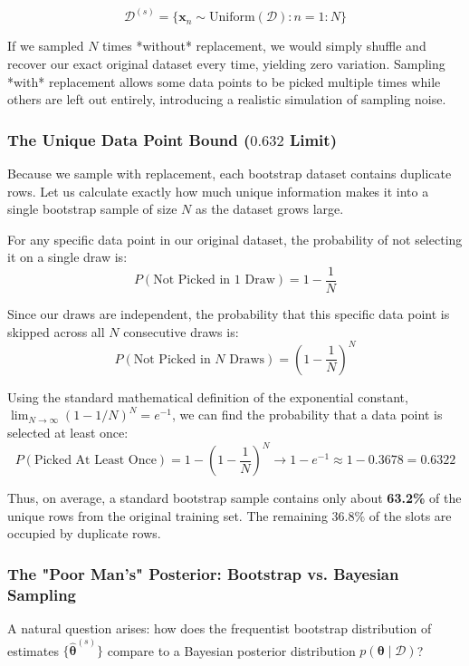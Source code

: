 \documentclass{article}
\begin{document}
\begin{equation}
\mathcal{D}^{(s)} = \{\mathbf{x}_n \sim \text{Uniform}(\mathcal{D}) : n = 1 : N\}
\end{equation}

If we sampled $N$ times *without* replacement, we would simply shuffle and recover our exact original dataset every time, yielding zero variation. Sampling *with* replacement allows some data points to be picked multiple times while others are left out entirely, introducing a realistic simulation of sampling noise.



\subsubsection{The Unique Data Point Bound ($0.632$ Limit)}
Because we sample with replacement, each bootstrap dataset contains duplicate rows. Let us calculate exactly how much unique information makes it into a single bootstrap sample of size $N$ as the dataset grows large.

For any specific data point in our original dataset, the probability of not selecting it on a single draw is:
\begin{equation}
P(\text{Not Picked in 1 Draw}) = 1 - \frac{1}{N}
\end{equation}

Since our draws are independent, the probability that this specific data point is skipped across all $N$ consecutive draws is:
\begin{equation}
P(\text{Not Picked in } N \text{ Draws}) = \left(1 - \frac{1}{N}\right)^N
\end{equation}

Using the standard mathematical definition of the exponential constant, $\lim_{N \to \infty} (1 - 1/N)^N = e^{-1}$, we can find the probability that a data point is selected at least once:
\begin{equation}
P(\text{Picked At Least Once}) = 1 - \left(1 - \frac{1}{N}\right)^N \to 1 - e^{-1} \approx 1 - 0.3678 = 0.6322
\end{equation}

Thus, on average, a standard bootstrap sample contains only about \textbf{63.2\%} of the unique rows from the original training set. The remaining $36.8\%$ of the slots are occupied by duplicate rows.

\subsubsection{The "Poor Man's" Posterior: Bootstrap vs. Bayesian Sampling}
A natural question arises: how does the frequentist bootstrap distribution of estimates $\{\hat{\boldsymbol{\theta}}^{(s)}\}$ compare to a Bayesian posterior distribution $p(\boldsymbol{\theta} \mid \mathcal{D})$?
\end{document}
